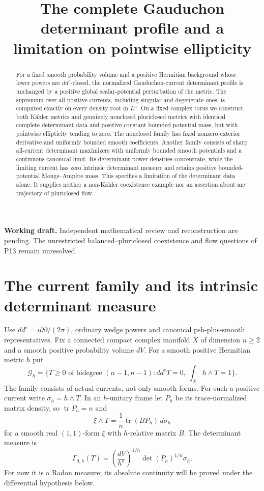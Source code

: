 \documentclass[11pt]{article}
\title{The complete Gauduchon determinant profile\newline
and a limitation on pointwise ellipticity}
\author{}\date{}
\newcommand{\ddc}{dd^c}
\newcommand{\tr}{\operatorname{tr}}
\newcommand{\Ga}{\mathcal G}
\theoremstyle{remark}\newtheorem{remark}[theorem]{Remark}
\begin{document}
\maketitle
\noindent\textbf{Working draft.} Independent mathematical review and
reconstruction are pending. The unrestricted balanced--pluriclosed
coexistence and flow questions of P13 remain unresolved.
\begin{abstract}
For a fixed smooth probability volume and a positive Hermitian background
whose lower powers are $dd^c$-closed,
the normalized Gauduchon-current determinant profile is unchanged by
a positive global scalar-potential perturbation of the metric.
The supremum over all positive currents, including singular and
degenerate ones, is computed exactly on every density root in $L^n$.
On a fixed complex torus we construct both K\"ahler metrics and genuinely
nonclosed pluriclosed metrics with identical complete determinant data
and positive constant bounded-potential mass, but with pointwise
ellipticity tending to zero. The nonclosed family has fixed nonzero
exterior derivative and uniformly bounded smooth coefficients.
Another family consists of sharp all-current determinant maximizers
with uniformly bounded smooth potentials and a continuous canonical
limit. Its determinant-power densities concentrate, while the limiting
current has zero intrinsic determinant measure and retains positive
bounded-potential Monge--Amp\`ere mass.
This specifies a limitation of the determinant data alone. It supplies
neither a non-K\"ahler coexistence example nor an assertion about any
trajectory of pluriclosed flow.
\end{abstract}

\section{The current family and its intrinsic determinant measure}
Use $\ddc=i\partial\bar\partial/(2\pi)$, ordinary wedge powers and
canonical psh-plus-smooth representatives. Fix a connected compact
complex manifold $X$ of dimension $n\geq2$ and a smooth positive
probability volume $dV$. For a smooth positive Hermitian metric $h$ put
\[
 \Ga_h=\{T\geq0\text{ of bidegree }(n-1,n-1):
            \ddc T=0,\ \int_Xh\wedge T=1\}.
\]
The family consists of actual currents, not only smooth forms.
For such a positive current write $\sigma_h=h\wedge T$. In an
$h$-unitary frame let $P_h$ be its trace-normalized matrix density,
so $\tr P_h=n$ and
\[
 \xi\wedge T=\frac1n\tr(BP_h)\,d\sigma_h
\]
for a smooth real $(1,1)$-form $\xi$ with $h$-relative matrix $B$.
The determinant measure is
\[
 \Gamma_{0,h}(T)=
 \left(\frac{dV}{h^n}\right)^{1/n}
       \det(P_h)^{1/n}\sigma_h.
\]
For now it is a Radon measure; its absolute continuity will be proved
under the differential hypothesis below.
\end{document}
